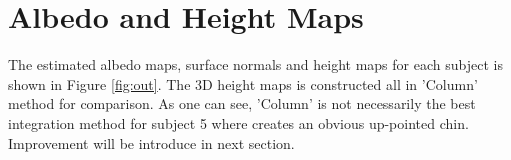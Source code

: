 \documentclass[a4paper]{article}
\begin{document}
\section{Albedo and Height Maps}
The estimated albedo maps, surface normals and height maps for each subject is shown in Figure \ref{fig:out}. The 3D height maps is constructed all in 'Column' method for comparison. As one can see,
'Column' is not necessarily the best integration method for subject 5 where creates an obvious up-pointed chin. Improvement will be introduce in next section.

\begin{figure}[h!]
\centering
{}
\centering
{}

\end{figure}
\end{document}
